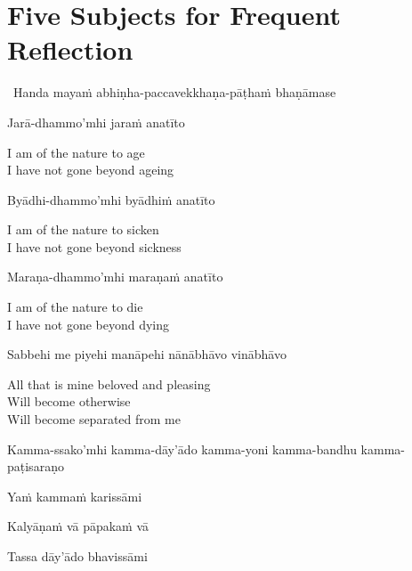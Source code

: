 \section{Five Subjects for Frequent Reflection}
\label{five-reflections}

\begin{leader}
  \anglebracketleft\ \hspace{-0.5mm}Handa mayaṁ abhiṇha-paccavekkhaṇa-pāṭhaṁ bhaṇāmase \hspace{-0.5mm}\anglebracketright\
\end{leader}

Jarā-dhammo'mhi jaraṁ anatīto

\begin{english}
  I am of the nature to age\\
  I have not gone beyond ageing
\end{english}

Byādhi-dhammo'mhi byādhiṁ anatīto

\begin{english}
  I am of the nature to sicken\\
  I have not gone beyond sickness
\end{english}

Maraṇa-dhammo'mhi maraṇaṁ anatīto

\begin{english}
  I am of the nature to die\\
  I have not gone beyond dying
\end{english}

Sabbehi me piyehi manāpehi nānābhāvo vinābhāvo

\begin{english}
  All that is mine beloved and pleasing\\
  Will become otherwise\\
  Will become separated from me
\end{english}

\begin{pali-hang}
  Kamma-ssako'mhi kamma-dāy'ādo kamma-yoni kamma-bandhu kamma-paṭisaraṇo\\
\end{pali-hang}
\begin{pali-hang-together}
  Yaṁ kammaṁ karissāmi\\
\end{pali-hang-together}
\begin{pali-hang-together}
  Kalyāṇaṁ vā pāpakaṁ vā\\
\end{pali-hang-together}
\begin{pali-hang-together}
  Tassa dāy'ādo bhavissāmi
\end{pali-hang-together}

